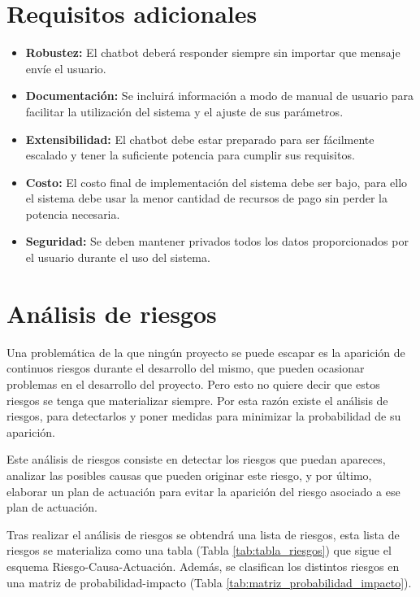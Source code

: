 \section{Requisitos adicionales}

\begin{itemize}
\item \textbf{Robustez:} El chatbot deberá responder siempre sin importar que mensaje envíe el usuario.
\item \textbf{Documentación:} Se incluirá información a modo de manual de usuario para facilitar la utilización del sistema y el ajuste de sus parámetros.
\item \textbf{Extensibilidad:} El chatbot debe estar preparado para ser fácilmente escalado y tener la suficiente potencia para cumplir sus requisitos.
\item \textbf{Costo:} El costo final de implementación del sistema debe ser bajo, para ello el sistema debe usar la menor cantidad de recursos de pago sin perder la potencia necesaria.
\item \textbf{Seguridad:} Se deben mantener privados todos los datos proporcionados por el usuario durante el uso del sistema.
\end{itemize}

\section{Análisis de riesgos}

Una problemática de la que ningún proyecto se puede escapar es la aparición de continuos riesgos durante el desarrollo del mismo, que pueden ocasionar problemas en el desarrollo del proyecto. Pero esto no quiere decir que estos riesgos se tenga que materializar siempre. Por esta razón existe el análisis de riesgos, para detectarlos y poner medidas para minimizar la probabilidad de su aparición.

Este análisis de riesgos consiste en detectar los riesgos que puedan apareces, analizar las posibles causas que pueden originar este riesgo, y por último, elaborar un plan de actuación para evitar la aparición del riesgo asociado a ese plan de actuación.

Tras realizar el análisis de riesgos se obtendrá una lista de riesgos, esta lista de riesgos se materializa como una tabla (Tabla \ref{tab:tabla_riesgos}) que sigue el esquema Riesgo-Causa-Actuación. Además, se clasifican los distintos riesgos en una matriz de probabilidad-impacto (Tabla \ref{tab:matriz_probabilidad_impacto}).

